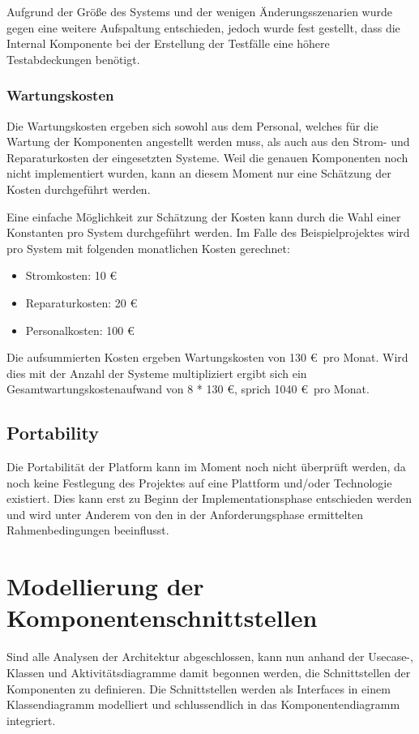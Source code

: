 Aufgrund der Größe des Systems und der wenigen Änderungsszenarien wurde gegen eine weitere Aufspaltung entschieden, jedoch wurde fest gestellt, dass die Internal Komponente bei der Erstellung der Testfälle eine höhere Testabdeckungen benötigt.

\subsubsection{Wartungskosten}
Die Wartungskosten ergeben sich sowohl aus dem Personal, welches für die Wartung der Komponenten angestellt werden muss, als auch aus den Strom- und Reparaturkosten der eingesetzten Systeme. Weil die genauen Komponenten noch nicht implementiert wurden, kann an diesem Moment nur eine Schätzung der Kosten durchgeführt werden.

Eine einfache Möglichkeit zur Schätzung der Kosten kann durch die Wahl einer Konstanten pro System durchgeführt werden. Im Falle des Beispielprojektes wird pro System mit folgenden monatlichen Kosten gerechnet:

\begin{itemize}
  \item Stromkosten: 10 \euro
  \item Reparaturkosten: 20 \euro
  \item Personalkosten: 100 \euro
\end{itemize}

Die aufsummierten Kosten ergeben Wartungskosten von 130 \euro \ pro Monat. Wird dies mit der Anzahl der Systeme multipliziert ergibt sich ein Gesamtwartungskostenaufwand von 8 * 130 \euro, sprich 1040 \euro \ pro Monat.

\subsection{Portability}
Die Portabilität der Platform kann im Moment noch nicht überprüft werden, da noch keine Festlegung des Projektes auf eine Plattform und/oder Technologie existiert. Dies kann erst zu Beginn der Implementationsphase entschieden werden und wird unter Anderem von den in der Anforderungsphase ermittelten Rahmenbedingungen beeinflusst.


\section{Modellierung der Komponentenschnittstellen}
Sind alle Analysen der Architektur abgeschlossen, kann nun anhand der Usecase-, Klassen und Aktivitätsdiagramme damit begonnen werden, die Schnittstellen der Komponenten zu definieren. Die Schnittstellen werden als Interfaces in einem Klassendiagramm modelliert und schlussendlich in das Komponentendiagramm integriert.

